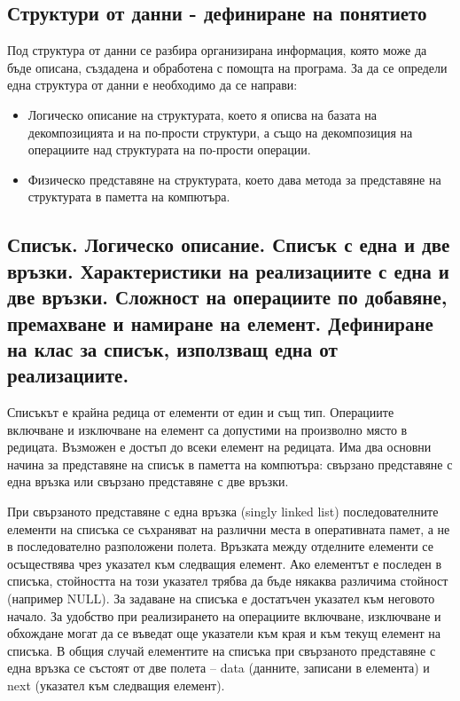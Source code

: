 \documentclass{article}
\renewcommand{\\}{\newline}
\begin{document}
\subsection{Структури от данни - дефиниране на понятието} Под структура от данни се разбира организирана информация, която може да бъде описана, създадена и обработена с помощта на програма. За да се определи една структура от данни е необходимо да се направи:
\begin{itemize}
    \item Логическо описание на структурата, което я описва на базата на декомпозицията и на по-прости структури, а също на декомпозиция на операциите над структурата на по-прости операции.
    \item Физическо представяне на структурата, което дава метода за представяне на структурата в паметта на компютъра.
\end{itemize}

\subsection{Списък. Логическо описание. Списък с една и две връзки. Характеристики на реализациите с една и две връзки. Сложност на операциите по добавяне, премахване и намиране на елемент. Дефиниране на клас за списък, използващ една от реализациите.}

Списъкът е крайна редица от елементи от един и същ тип. Операциите включване и изключване на елемент са допустими на произволно място в редицата. Възможен е достъп до всеки елемент на редицата. Има два основни начина за представяне на списък в паметта на компютъра: свързано представяне с една връзка или свързано представяне с две връзки.

При свързаното представяне  с една връзка (singly linked list) последователните елементи на списъка се съхраняват на различни места в оперативната памет, а не в последователно разположени полета. Връзката между отделните елементи се осъществява чрез указател към следващия елемент. Ако елементът е последен в списъка, стойността на този указател трябва да бъде някаква различима стойност (например NULL). За задаване на списъка е достатъчен указател към неговото начало. За удобство при реализирането на операциите включване, изключване и обхождане могат да се въведат още указатели към края и към текущ елемент на списъка. В общия случай елементите на списъка при свързаното представяне с една връзка се състоят от две полета – data (данните, записани в елемента) и next (указател към следващия елемент).
\end{document}
